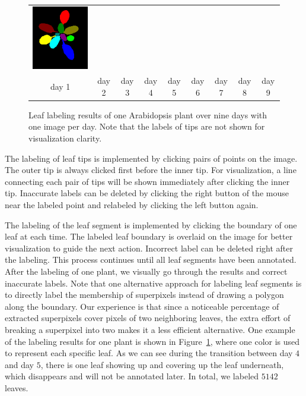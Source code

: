 \begin{figure}
\begin{centering}
\begin{tabular}{@{}c@{} c@{} c@{} c@{} c@{} c@{} c@{} c@{} c@{}}
\includegraphics[width=.11\textwidth]{Figures/labelExample/plant_1_day_9_num_13.png}\\
  day 1 & day 2 & day 3 & day 4 & day 5 & day 6 & day 7 & day 8 & day 9 \\
\end{tabular}
\caption{Leaf labeling results of one Arabidopsis plant over nine days with one image per day. Note that the labels of tips are not shown for visualization clarity. }
\label{fig:LabelExample}
\end{centering}
\end{figure}

The labeling of leaf tips is implemented by clicking pairs of points on the image.
The outer tip is always clicked first before the inner tip.
For visualization, a line connecting each pair of tips will be shown immediately after clicking the inner tip.
Inaccurate labels can be deleted by clicking the right button of the mouse near the labeled point and relabeled by clicking the left button again.

The labeling of the leaf segment is implemented by clicking the boundary of one leaf at each time.
The labeled leaf boundary is overlaid on the image for better visualization to guide the next action.
Incorrect label can be deleted right after the labeling.
This process continues until all leaf segments have been annotated.
After the labeling of one plant, we visually go through the results and correct inaccurate labels.
Note that one alternative approach for labeling leaf segments is to directly label the membership of superpixels instead of drawing a polygon along the boundary.
Our experience is that since a noticeable percentage of extracted superpixels cover pixels of two neighboring leaves, the extra effort of breaking a superpixel into two makes it a less efficient alternative.
One example of the labeling results for one plant is shown in Figure~\ref{fig:LabelExample}, where one color is used to represent each specific leaf.
As we can see during the transition between day $4$ and day $5$, there is one leaf showing up and covering up the leaf underneath, which disappears and will not be annotated later.
In total, we labeled $5142$ leaves. 






